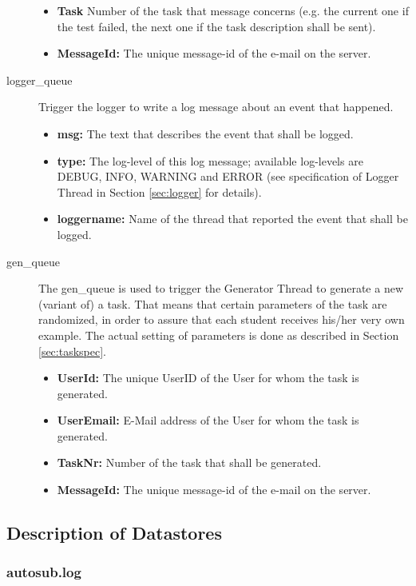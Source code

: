 \begin{description}
\begin{itemize}
        \item {\bf Task} Number of the task that message concerns (e.g. the current one if the test failed, 
        the next one if the task description shall be sent).
        \item {\bf MessageId:} The unique message-id of the e-mail on the server.
    \end{itemize}
\newpage
\item [logger\_queue] Trigger the logger to write a log message about an event that happened.
    \begin{itemize}
        \item {\bf msg:} The text that describes the event that shall be logged.
        \item {\bf type:} The log-level of this log message; available log-levels are DEBUG, INFO, 
            WARNING and ERROR (see specification of Logger Thread in Section \ref{sec:logger} for details).
        \item {\bf loggername:} Name of the thread that reported the event that shall be logged.
    \end{itemize}
\item [gen\_queue] The gen\_queue is used to trigger the Generator Thread to generate a new (variant of) a 
    task. That means that certain parameters of the task are randomized, in order to assure that each student 
    receives his/her very own example. The actual setting of parameters is done as described 
    in Section \ref{sec:taskspec}.
    \begin{itemize}
        \item {\bf UserId:} The unique UserID of the User for whom the task is generated.
        \item {\bf UserEmail:} E-Mail address of the User for whom the task is generated.
        \item {\bf TaskNr:} Number of the task that shall be generated.
        \item {\bf MessageId:} The unique message-id of the e-mail on the server.
    \end{itemize}
\end{description}

\subsection{Description of Datastores}

\subsubsection{autosub.log}

